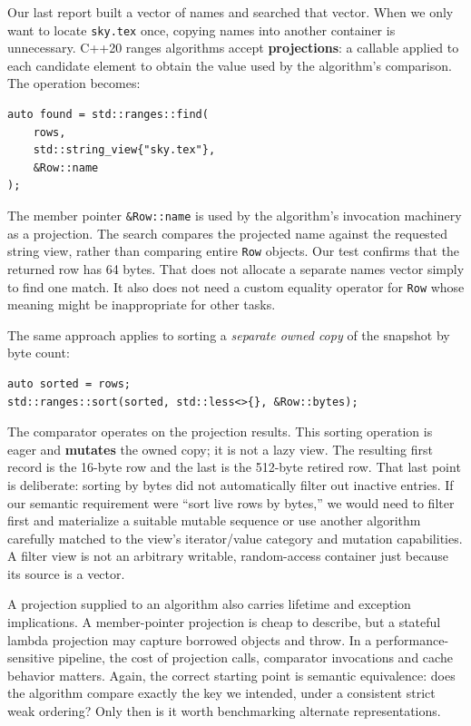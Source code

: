 Our last report built a vector of names and searched that vector. When we only want to locate \texttt{sky.tex} once, copying names into another container is unnecessary. C++20 ranges algorithms accept \textbf{projections}: a callable applied to each candidate element to obtain the value used by the algorithm's comparison. The operation becomes:

\begin{verbatim}
auto found = std::ranges::find(
    rows,
    std::string_view{"sky.tex"},
    &Row::name
);
\end{verbatim}

The member pointer \texttt{\&Row::name} is used by the algorithm's invocation machinery as a projection. The search compares the projected name against the requested string view, rather than comparing entire \texttt{Row} objects. Our test confirms that the returned row has 64 bytes. That does not allocate a separate names vector simply to find one match. It also does not need a custom equality operator for \texttt{Row} whose meaning might be inappropriate for other tasks.

The same approach applies to sorting a \emph{separate owned copy} of the snapshot by byte count:

\begin{verbatim}
auto sorted = rows;
std::ranges::sort(sorted, std::less<>{}, &Row::bytes);
\end{verbatim}

The comparator operates on the projection results. This sorting operation is eager and \textbf{mutates} the owned copy; it is not a lazy view. The resulting first record is the 16-byte row and the last is the 512-byte retired row. That last point is deliberate: sorting by bytes did not automatically filter out inactive entries. If our semantic requirement were ``sort live rows by bytes,'' we would need to filter first and materialize a suitable mutable sequence or use another algorithm carefully matched to the view's iterator/value category and mutation capabilities. A filter view is not an arbitrary writable, random-access container just because its source is a vector.

A projection supplied to an algorithm also carries lifetime and exception implications. A member-pointer projection is cheap to describe, but a stateful lambda projection may capture borrowed objects and throw. In a performance-sensitive pipeline, the cost of projection calls, comparator invocations and cache behavior matters. Again, the correct starting point is semantic equivalence: does the algorithm compare exactly the key we intended, under a consistent strict weak ordering? Only then is it worth benchmarking alternate representations.

